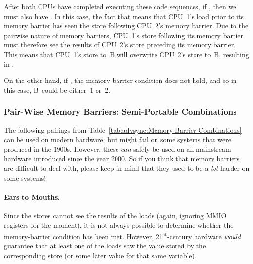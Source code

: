 	After both CPUs have completed executing these code sequences,
	if , then we must also have .
	In this case, the fact that  means that
	CPU~1's load prior to its memory barrier has
	seen the store following CPU~2's memory barrier.
	Due to the pairwise nature of memory barriers, CPU~1's
	store following its memory barrier must therefore see
	the results of CPU~2's store preceding its memory barrier.
	This means that CPU~1's store to~B will overwrite CPU~2's
	store to~B, resulting in .

	On the other hand, if , the memory-barrier condition
	does not hold, and so in this case, B~could be either~1 or~2.

\subsubsection{Pair-Wise Memory Barriers: Semi-Portable Combinations}

The following pairings from
Table~\ref{tab:advsync:Memory-Barrier Combinations}
can be used on modern hardware, but might fail on some systems
that were produced in the 1900s.
However, these \emph{can} safely be used on all mainstream hardware
introduced since the year 2000.
So if you think that memory barriers are difficult to deal with, please
keep in mind that they used to be a \emph{lot} harder on some systems!

\paragraph{Ears to Mouths.}
	Since the stores cannot see the results of the loads
	(again, ignoring MMIO registers for the moment),
	it is not always possible to determine whether the memory-barrier
	condition has been met.
	However, 21\textsuperscript{st}-century
	hardware \emph{would} guarantee that at least one
	of the loads saw the value stored by the corresponding store
	(or some later value for that same variable).

